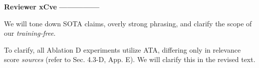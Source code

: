 \vspace{-0.3em}
\noindent{\textcolor{MyCyan}{\Large\textbf{------------\quad}}}
\textcolor{MyCyan}{\textbf{Reviewer xCve}} 
\textcolor{MyCyan}{\Large\textbf{\quad---------------}}

\vspace{-0.2em}
%
%
We will tone down SOTA claims, overly strong phrasing, and clarify the scope of our \textit{training-free}.


\vspace{-0.2em}
To clarify, all Ablation D experiments utilize ATA, differing only in relevance score \textit{sources} (refer to Sec. 4.3-D, App. E). We will clarify this in the revised text.

